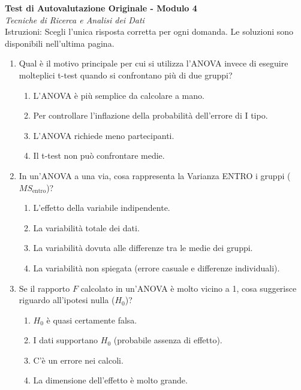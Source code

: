 \documentclass[12pt, a4paper]{article}
\newcommand{\Hnull}{H_0} %
\newcommand{\Fscore}{F} %
\newcommand{\MSw}{MS_{\text{entro}}} %
\begin{document}
\begin{center}
    \Large\textbf{Test di Autovalutazione Originale - Modulo 4} \\
    \vspace{0.2cm}
    \large\textit{Tecniche di Ricerca e Analisi dei Dati} \\
    \vspace{0.5cm}
    \normalsize{Istruzioni: Scegli l'unica risposta corretta per ogni domanda. Le soluzioni sono disponibili nell'ultima pagina.}
\end{center}
\vspace{1cm}

\begin{enumerate} %
    \item Qual è il motivo principale per cui si utilizza l'ANOVA invece di eseguire molteplici t-test quando si confrontano più di due gruppi?
    \begin{enumerate} %
        \item L'ANOVA è più semplice da calcolare a mano.
        \item Per controllare l'inflazione della probabilità dell'errore di I tipo.
        \item L'ANOVA richiede meno partecipanti.
        \item Il t-test non può confrontare medie.
    \end{enumerate}

    \item In un'ANOVA a una via, cosa rappresenta la Varianza ENTRO i gruppi ($\MSw$)?
    \begin{enumerate}
        \item L'effetto della variabile indipendente.
        \item La variabilità totale dei dati.
        \item La variabilità dovuta alle differenze tra le medie dei gruppi.
        \item La variabilità non spiegata (errore casuale e differenze individuali).
    \end{enumerate}

    \item Se il rapporto $\Fscore$ calcolato in un'ANOVA è molto vicino a 1, cosa suggerisce riguardo all'ipotesi nulla ($\Hnull$)?
    \begin{enumerate}
        \item $\Hnull$ è quasi certamente falsa.
        \item I dati supportano $\Hnull$ (probabile assenza di effetto).
        \item C'è un errore nei calcoli.
        \item La dimensione dell'effetto è molto grande.
    \end{enumerate}


\end{enumerate}
\end{document}
